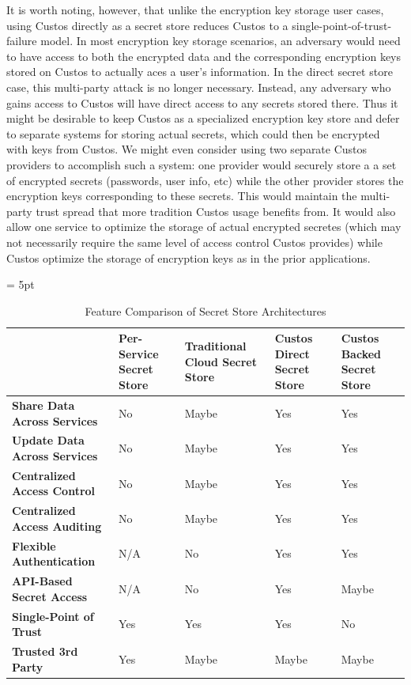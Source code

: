 It is worth noting, however, that unlike the encryption key storage
user cases, using Custos directly as a secret store reduces Custos to
a single-point-of-trust-failure model. In most encryption key storage
scenarios, an adversary would need to have access to both the
encrypted data and the corresponding encryption keys stored on Custos
to actually aces a user's information. In the direct secret store
case, this multi-party attack is no longer necessary. Instead, any
adversary who gains access to Custos will have direct access to any
secrets stored there. Thus it might be desirable to keep Custos as a
specialized encryption key store and defer to separate systems for
storing actual secrets, which could then be encrypted with keys from
Custos. We might even consider using two separate Custos providers to
accomplish such a system: one provider would securely store a a set of
encrypted secrets (passwords, user info, etc) while the other provider
stores the encryption keys corresponding to these secrets. This would
maintain the multi-party trust spread that more tradition Custos usage
benefits from. It would also allow one service to optimize the storage
of actual encrypted secretes (which may not necessarily require the
same level of access control Custos provides) while Custos optimize
the storage of encryption keys as in the prior applications.

\begin{table}[!tb]
  \vspace{5ex}
  \begin{center}
    \tabulinesep = 5pt
    \begin{tabu} to \textwidth
      { | X[1.5,c,m]
        | X[1,c,m]
        | X[1,c,m]
        | X[1,c,m]
        | X[1,c,m]
        | }
      \hline
      & \textbf{Per-Service Secret Store}
      & \textbf{Traditional Cloud Secret Store}
      & \textbf{Custos Direct Secret Store}
      & \textbf{Custos Backed Secret Store}
      \\ \hline
      \textbf{Share Data Across Services}
      & No & Maybe & Yes & Yes
      \\ \hline
      \textbf{Update Data Across Services}
      & No & Maybe & Yes & Yes
      \\ \hline
      \textbf{Centralized Access Control}
      & No & Maybe & Yes & Yes
      \\ \hline
      \textbf{Centralized Access Auditing}
      & No & Maybe & Yes & Yes
      \\ \hline
      \textbf{Flexible Authentication}
      & N/A & No & Yes & Yes
      \\ \hline
      \textbf{API-Based Secret Access}
      & N/A & No & Yes & Maybe
      \\ \hline
      \textbf{Single-Point of Trust}
      & Yes & Yes & Yes & No
      \\ \hline
      \textbf{Trusted 3rd Party}
      & Yes & Maybe & Maybe & Maybe
      \\ \hline
      \end{tabu}
  \end{center}
  \caption{Feature Comparison of Secret Store Architectures}
  \label{tab:comp-ss}
\end{table}

